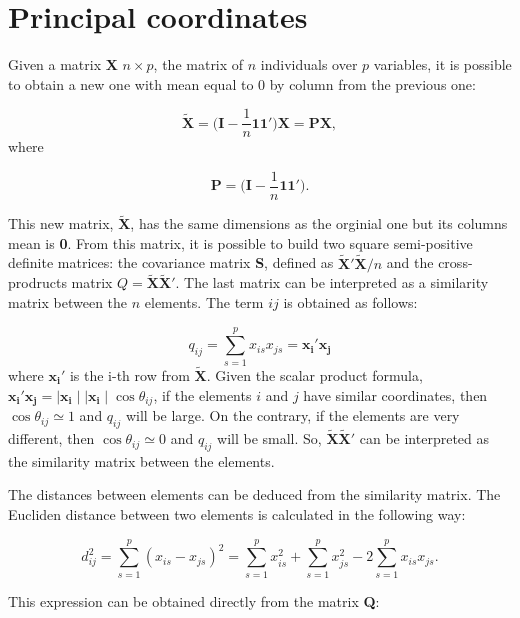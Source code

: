 \documentclass[11pt]{report}
\begin{document}
\section{Principal coordinates}
Given a matrix \textbf{X} $n \times p$, the matrix of $n$ 
individuals over $p$ variables, it is possible to obtain a new one with 
mean equal to 0 by column from the previous one:

\[
\mathbf{\widetilde{X}} = \Big( \mathbf{I} - \frac{1}{n} \mathbf{1}\mathbf{1'}\Big) \mathbf{X} = \mathbf{P}\mathbf{X},
\]
where 

\[
\mathbf{P} = \Big( \mathbf{I} - \frac{1}{n} \mathbf{1}\mathbf{1'}\Big).
\]

\indent This new matrix, $\mathbf{\widetilde{X}}$, has the same dimensions as 
the orginial one but its columns mean is \textbf{0}. From this matrix, it is 
possible to build two square semi-positive definite matrices: the covariance 
matrix \textbf{S}, defined as $\mathbf{\widetilde{X}'}\mathbf{\widetilde{X}}/n$ 
and the cross-prodructs matrix $Q = \mathbf{\widetilde{X}}\mathbf{\widetilde{X}'}$. 
The last matrix can be interpreted as a similarity matrix between the $n$ elements. 
The term $ij$ is obtained as follows:

\begin{equation} \label{qij}
q_{ij} = \sum_{s=1}^{p} x_{is}x_{js} = \mathbf{x_i'} \mathbf{x_j}
\end{equation}
where $\mathbf{x_i'}$ is the i-th row from $\mathbf{\widetilde{X}}$. 
Given the scalar product formula, ${\mathbf{x_i'}\mathbf{x_j} =  \mid \mathbf{x_i} \mid \mid \mathbf{x_i} \mid \cos\theta_{ij}}$,
if the elements $i$ and $j$ have similar coordinates, then $\cos\theta_{ij} \simeq 1$
and $q_{ij}$ will be large. On the contrary, if the elements are very different,
then $\cos \theta_{ij} \simeq 0$ and $q_{ij}$ will be small. So, 
$\mathbf{\widetilde{X}}\mathbf{\widetilde{X}'}$ can be interpreted as the similarity
matrix between the elements.

\indent The distances between elements can be deduced from the similarity 
matrix. The Eucliden distance between two elements is calculated in the 
following way:

\begin{equation} \label{dij}
d^2_{ij} =  \sum_{s=1}^{p} (x_{is}- x_{js} )^2  = \sum_{s=1}^{p}x_{is}^2 + \sum_{s=1}^p x_{js}^2 - 2\sum_{s=1}^{p} x_{is}x_{js}.
\end{equation}

\indent This expression can be obtained directly from the matrix \textbf{Q}:
\end{document}
